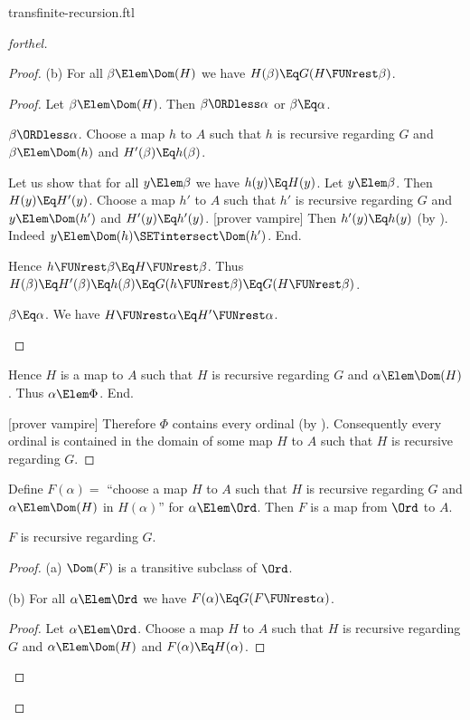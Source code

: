 \documentclass{stex}
\begin{document}
\begin{smodule}{transfinite-recursion.ftl}
\begin{proof}[forthel]
\begin{proof}
      (b) For all $\beta \Elem \Dom(H)$ we have $H(\beta) \Eq G(H \FUNrest \beta)$.
      \begin{proof}
        Let $\beta \Elem \Dom(H)$.
        Then $\beta \ORDless \alpha$ or $\beta \Eq \alpha$.

        \begin{case}{$\beta \ORDless \alpha$.}
          Choose a map $h$ to $A$ such that $h$ is recursive regarding $G$ and $\beta \Elem \Dom(h)$ and $H'(\beta) \Eq h(\beta)$.

          Let us show that for all $y \Elem \beta$ we have $h(y) \Eq H(y)$.
            Let $y \Elem \beta$.
            Then $H(y) \Eq H'(y)$.
            Choose a map $h'$ to $A$ such that $h'$ is recursive regarding $G$ and $y \Elem \Dom(h')$ and $H'(y) \Eq h'(y)$.
            [prover vampire]
            Then $h'(y) \Eq h(y)$ (by ).
            Indeed $y \Elem \Dom(h) \SETintersect \Dom(h')$.
          End.

          Hence $h \FUNrest \beta \Eq H \FUNrest \beta$.
          Thus $H(\beta)
            \Eq H'(\beta)
            \Eq h(\beta)
            \Eq G(h \FUNrest \beta)
            \Eq G(H \FUNrest \beta)$.
        \end{case}

        \begin{case}{$\beta \Eq \alpha$.}
          We have $H \FUNrest \alpha \Eq H' \FUNrest \alpha$.
        \end{case}
      \end{proof}

      Hence $H$ is a map to $A$ such that $H$ is recursive regarding $G$ and $\alpha \Elem \Dom(H)$.
      Thus $\alpha \Elem \Phi$.
    End.

    [prover vampire]
    Therefore $\Phi$ contains every ordinal (by ).
    Consequently every ordinal is contained in the domain of some map $H$ to $A$ such that $H$ is recursive regarding $G$.
  \end{proof}

  Define $F(\alpha) =$ ``choose a map $H$ to $A$ such that $H$ is recursive regarding $G$ and $\alpha \Elem \Dom(H)$ in $H(\alpha)$'' for $\alpha \Elem \Ord$.
  Then $F$ is a map from $\Ord$ to $A$.

  $F$ is recursive regarding $G$.
  \begin{proof}
    (a) $\Dom(F)$ is a transitive subclass of $\Ord$.

    (b) For all $\alpha \Elem \Ord$ we have $F(\alpha) \Eq G(F \FUNrest \alpha)$.
    \begin{proof}
      Let $\alpha \Elem \Ord$.
      Choose a map $H$ to $A$ such that $H$ is recursive regarding $G$ and $\alpha \Elem \Dom(H)$ and $F(\alpha) \Eq H(\alpha)$.


\end{proof}
\end{proof}
\end{proof}
\end{smodule}
\end{document}

